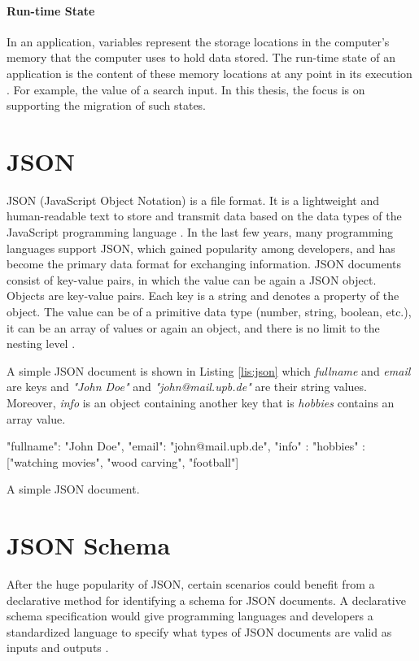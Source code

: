 \paragraph{Run-time State}
In an application, variables represent the storage locations in the computer's memory that the computer uses to hold data stored. The run-time state of an application is the content of these memory locations at any point in its execution \cite{Laplante2000-ui}. For example, the value of a search input. In this thesis, the focus is on supporting the migration of such states.

\section{JSON}
JSON (JavaScript Object Notation) is a file format. It is a lightweight and human-readable text to store and transmit data based on the data types of the JavaScript programming language \cite{json}. In the last few years, many programming languages support JSON, which gained popularity among developers, and has become the primary data format for exchanging information. JSON documents consist of key-value pairs, in which the value can be again a JSON object. Objects are key-value pairs. Each key is a string and denotes a property of the object. The value can be of a primitive data type (number, string, boolean, etc.), it can be an array of values or again an object, and there is no limit to the nesting level \cite{json-schema}. 

A simple JSON document is shown in Listing \ref{lis:json} which \textit{fullname} and \textit{email} are keys and \textit{"John Doe"} and \textit{"john@mail.upb.de"} are their string values. Moreover, \textit{info} is an object containing another key that is \textit{hobbies} contains an array value.

\FloatBarrier
\begin{code}
\begin{json}
{
    "fullname": "John Doe",
    "email": "john@mail.upb.de",
    "info" : {
        "hobbies" : ["watching movies", "wood carving", "football"]
    }
}
\end{json}
\caption{A simple JSON document.}
\label{lis:json}
\end{code}
\FloatBarrier

\section{JSON Schema}
After the huge popularity of JSON, certain scenarios could benefit from a declarative method for identifying a schema for JSON documents.
A declarative schema specification would give programming languages and developers a standardized language to specify what types of JSON documents are valid as inputs and outputs \cite{json-schema}.


